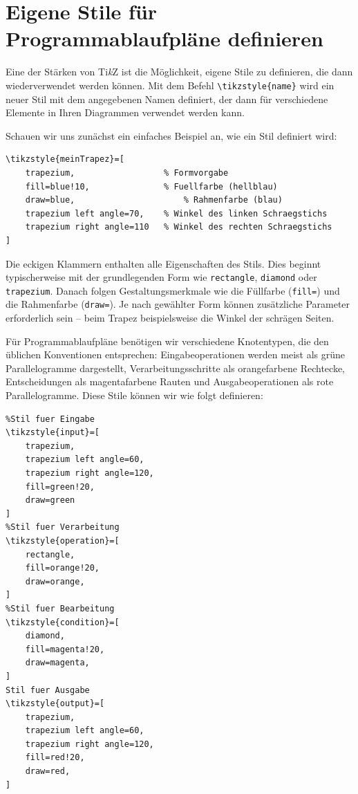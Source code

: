 \section{Eigene Stile für Programmablaufpläne definieren}

Eine der Stärken von Ti\textit{k}Z ist die Möglichkeit, eigene Stile zu definieren, die dann wiederverwendet werden können. Mit dem Befehl \texttt{\textbackslash tikzstyle\{name\}} wird ein neuer Stil mit dem angegebenen Namen definiert, der dann für verschiedene Elemente in Ihren Diagrammen verwendet werden kann.

Schauen wir uns zunächst ein einfaches Beispiel an, wie ein Stil definiert wird:

\begin{lstlisting}[style=latex]
% Definition eines einfachen Trapez-Stils
\tikzstyle{meinTrapez}=[
	trapezium,                	% Formvorgabe
	fill=blue!10,             	% Fuellfarbe (hellblau)
	draw=blue,               	 	% Rahmenfarbe (blau)
	trapezium left angle=70,  	% Winkel des linken Schraegstichs
	trapezium right angle=110 	% Winkel des rechten Schraegstichs
]
\end{lstlisting}

Die eckigen Klammern enthalten alle Eigenschaften des Stils. Dies beginnt typischerweise mit der grundlegenden Form wie \texttt{rectangle}, \texttt{diamond} oder \texttt{trapezium}. Danach folgen Gestaltungsmerkmale wie die Füllfarbe (\texttt{fill=}) und die Rahmenfarbe (\texttt{draw=}). Je nach gewählter Form können zusätzliche Parameter erforderlich sein – beim Trapez beispielsweise die Winkel der schrägen Seiten.

Für Programmablaufpläne benötigen wir verschiedene Knotentypen, die den üblichen Konventionen entsprechen: Eingabeoperationen werden meist als grüne Parallelogramme dargestellt, Verarbeitungsschritte als orangefarbene Rechtecke, Entscheidungen als magentafarbene Rauten und Ausgabeoperationen als rote Parallelogramme. Diese Stile können wir wie folgt definieren:

\begin{lstlisting}[style=latex]
%Tikzstyles fuer Programmablaufplaene
%Stil fuer Eingabe
\tikzstyle{input}=[
	trapezium,
	trapezium left angle=60,
	trapezium right angle=120,
	fill=green!20,
	draw=green
]
%Stil fuer Verarbeitung
\tikzstyle{operation}=[
	rectangle,
	fill=orange!20,
	draw=orange,
]
%Stil fuer Bearbeitung
\tikzstyle{condition}=[
	diamond,
	fill=magenta!20,
	draw=magenta,
]
Stil fuer Ausgabe
\tikzstyle{output}=[
	trapezium,
	trapezium left angle=60,
	trapezium right angle=120,
	fill=red!20,
	draw=red,
]
\end{lstlisting}

